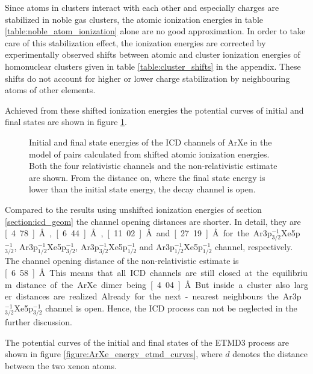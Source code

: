 Since atoms in clusters interact with each other and especially
charges are stabilized in noble gas clusters, the atomic
ionization energies  in table \ref{table:noble_atom_ionization} alone
are no good approximation. In order to take care of
this stabilization effect, the ionization energies are corrected by experimentally
observed shifts between atomic and cluster ionization energies of homonuclear
clusters given in table
\ref{table:cluster_shifts} in the appendix. These shifts do not account for
higher or
lower charge stabilization by neighbouring atoms of other elements.

Achieved from these shifted ionization energies the potential curves of
initial and final states are shown in figure \ref{ArXe_energy_curves_shifted}.

\begin{figure}[htb]
 \centering
 
 \caption{Initial and final state energies of the ICD channels of ArXe in the
          model of pairs calculated from shifted atomic ionization energies.
          Both the four relativistic channels and
          the non-relativistic estimate are shown. From the distance on, where
          the final state energy is lower than the initial state energy, the
          decay channel is open.}
 \label{ArXe_energy_curves_shifted}
\end{figure}

Compared to the results using unshifted ionization energies of section
\ref{section:icd_geom} the
channel opening distances are shorter.
In detail, they are \unit[4.78]{\AA}, \unit[6.44]{\AA}, \unit[11.02]{\AA}
and \unit[27.19]{\AA} for the Ar3p$_{3/2}^{-1}$Xe5p$_{3/2}^{-1}$,
Ar3p$_{1/2}^{-1}$Xe5p$_{3/2}^{-1}$, Ar3p$_{3/2}^{-1}$Xe5p$_{1/2}^{-1}$ and
Ar3p$_{1/2}^{-1}$Xe5p$_{1/2}^{-1}$ channel, respectively. The channel
opening distance of the non-relativistic estimate is \unit[6.58]{\AA}.
This means that all \ac{ICD} channels are still closed at the equilibrium
distance of the ArXe dimer being \unit[4.04]{\AA}. But inside a
cluster also larger distances are
realized. Already for the next-nearest neighbours the
Ar3p$_{3/2}^{-1}$Xe5p$_{3/2}^{-1}$ channel is open. Hence, the \ac{ICD}
process can not be neglected in the further discussion.

The potential curves of the initial and final states of the \ac{ETMD}3
process are shown in figure \ref{figure:ArXe_energy_etmd_curves}, where
$d$ denotes the distance between the two xenon atoms.

